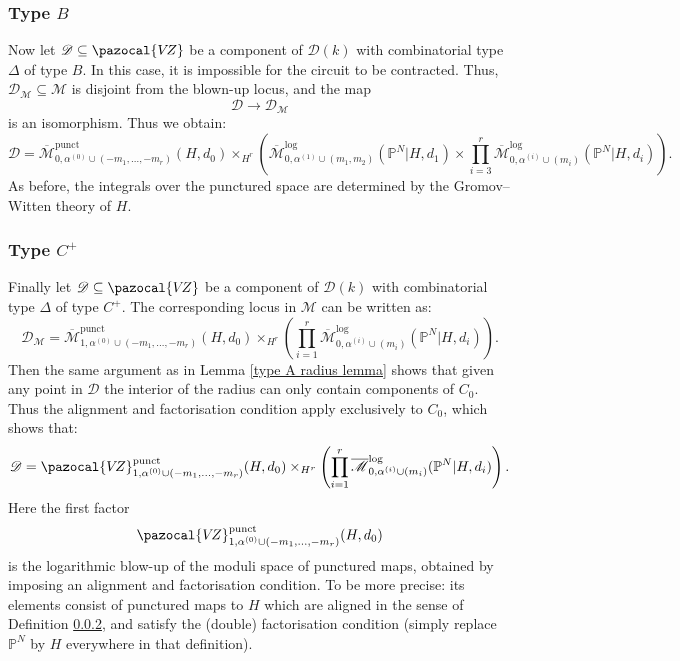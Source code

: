 \documentclass[11pt]{amsart}
\newcommand{\Mlog}[4]{\overline{\mathcal{M}}^{\operatorname{log}}_{#1,#2}(#3,#4)}
\newcommand{\Mpunct}[4]{\overline{\mathcal{M}}^{\operatorname{punct}}_{#1,#2}(#3,#4)}
\newcommand{\PP}{\mathbb P}
\newcommand{\VZ}{\pazocal{V\!Z}}
\renewcommand{\to}{\rightarrow}
\newcommand{\Mcal}{\mathcal{M}}
\newcommand{\Dcal}{\mathcal{D}}
\theoremstyle{definition}
\theoremstyle{definition}
\begin{document}
\subsubsection{Type $B$}
Now let $\Dcal\subseteq\VZ$ be a component of $\Dcal(k)$ with combinatorial type $\Delta$ of type $B$. In this case, it is impossible for the circuit to be contracted. Thus, $\Dcal_\Mcal \subseteq \Mcal$ is disjoint from the blown-up locus, and the map
\begin{equation*} \Dcal \to \Dcal_\Mcal \end{equation*}
is an isomorphism. Thus we obtain:
\begin{equation*} \Dcal = \Mpunct{0}{\alpha^{(0)}\cup(-m_1,\ldots,-m_r)}{H}{d_0}\times_{H^r}\left(\Mlog{0}{\alpha^{(1)}\cup(m_1,m_2)}{\PP^N|H}{d_1}\times\prod_{i=3}^r\Mlog{0}{\alpha^{(i)}\cup(m_i)}{\PP^N|H}{d_i}\right).\end{equation*}
As before, the integrals over the punctured space are determined by the Gromov--Witten theory of $H$.

\subsubsection{Type $C^+$} Finally let $\Dcal \subseteq \VZ$ be a component of $\Dcal(k)$ with combinatorial type $\Delta$ of type $C^+$. The corresponding locus in $\Mcal$ can be written as:
\begin{equation*} \Dcal_\Mcal = \Mpunct{1}{\alpha^{(0)}\cup(-m_1,\ldots,-m_r)}{H}{d_0} \times_{H^r} \left( \prod_{i=1}^r \Mlog{0}{\alpha^{(i)}\cup(m_i)}{\PP^N|H}{d_i} \right). \end{equation*}
Then the same argument as in Lemma \ref{type A radius lemma} shows that given any point in $\Dcal$ the interior of the radius can only contain components of $C_0$. Thus the alignment and factorisation condition apply exclusively to $C_0$, which shows that:
\begin{equation*}\Dcal = \VZ^{\operatorname{punct}}_{1,\alpha^{(0)}\cup(-m_1,\ldots,-m_r)}(H,d_0) \times_{H^r} \left( \prod_{i=1}^r \Mlog{0}{\alpha^{(i)}\cup(m_i)}{\PP^N|H}{d_i} \right). \end{equation*}
Here the first factor
\begin{equation*}\VZ^{\operatorname{punct}}_{1,\alpha^{(0)}\cup(-m_1,\ldots,-m_r)}(H,d_0) \end{equation*}
is the logarithmic blow-up of the moduli space of punctured maps, obtained by imposing an alignment and factorisation condition. To be more precise: its elements consist of punctured maps to $H$ which are aligned in the sense of Definition \ref{}, and satisfy the (double) factorisation condition (simply replace $\PP^N$ by $H$ everywhere in that definition).
\end{document}
